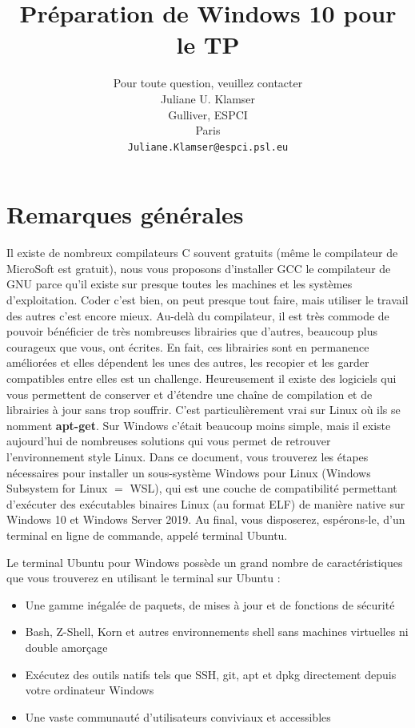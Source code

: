 \documentclass{article}
\title{Préparation de Windows 10 pour le TP}
\author{
Pour toute question, veuillez contacter\\
 Juliane U. Klamser\\%
  Gulliver,  ESPCI\\
  Paris \\
  \texttt{Juliane.Klamser@espci.psl.eu} \\
}
\begin{document}
\maketitle

\tableofcontents




\newpage
\section{Remarques générales}
Il existe de nombreux compilateurs C souvent gratuits (même le compilateur de MicroSoft est gratuit), nous vous proposons d'installer GCC le compilateur de GNU parce qu'il existe sur presque toutes les machines et les systèmes d'exploitation. Coder c'est bien, on peut presque tout faire, mais utiliser le travail des autres c'est encore mieux. Au-delà du compilateur, il est très commode de pouvoir bénéficier de très nombreuses librairies que d'autres, beaucoup plus courageux que vous, ont écrites. En fait, ces librairies sont en permanence améliorées et elles dépendent les unes des autres, les recopier et les garder compatibles entre elles est un challenge. 
Heureusement il existe des logiciels qui vous permettent de conserver et d'étendre une chaîne de compilation et de librairies à jour sans trop souffrir. C'est particulièrement vrai sur Linux où ils se nomment \textbf{apt-get}. Sur Windows c'était beaucoup moins simple, mais il existe aujourd'hui de nombreuses solutions qui vous permet de retrouver l’environnement style Linux. Dans ce document, vous trouverez les étapes nécessaires pour installer un sous-système Windows pour Linux (Windows Subsystem for Linux $=$ WSL), qui est une couche de compatibilité permettant d'exécuter des exécutables binaires Linux (au format ELF) de manière native sur Windows 10 et Windows Server 2019.  Au final, vous disposerez, espérons-le, d'un terminal en ligne de commande, appelé terminal Ubuntu.

Le terminal Ubuntu pour Windows possède un grand nombre de caractéristiques que vous trouverez en utilisant le terminal sur Ubuntu :
\begin{itemize}
\item Une gamme inégalée de paquets, de mises à jour et de fonctions de sécurité
\item Bash, Z-Shell, Korn et autres environnements shell sans machines virtuelles ni double amorçage
\item Exécutez des outils natifs tels que SSH, git, apt et dpkg directement depuis votre ordinateur Windows
\item Une vaste communauté d'utilisateurs conviviaux et accessibles
\end{itemize}
\end{document}
